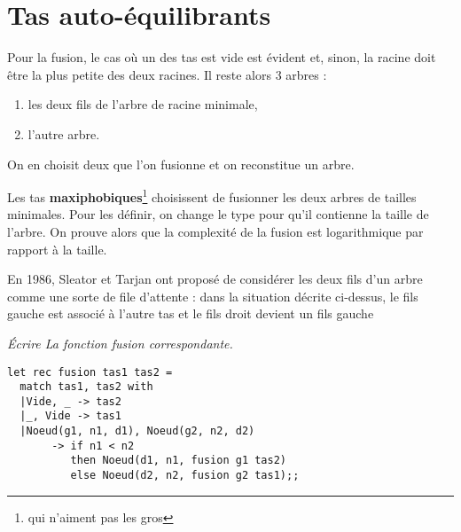 \section{Tas auto-équilibrants}

Pour la fusion, le cas où un des tas est vide est évident et, sinon, la racine doit être la plus petite des deux racines. Il reste alors 3 arbres :
\begin{enumerate}
    \item les deux fils de l'arbre de racine minimale,
    \item l'autre arbre.
\end{enumerate}
On en choisit deux que l'on fusionne et on reconstitue un arbre.

\medskip

Les tas {\bf maxiphobiques}\footnote{ qui n'aiment pas les gros} choisissent de fusionner les deux arbres de tailles minimales. Pour les définir, on change le type pour qu'il contienne la taille de l'arbre. On prouve alors que la complexité de la fusion est logarithmique par rapport à la taille.

\medskip

En 1986, Sleator et Tarjan ont proposé de considérer les deux fils d'un arbre comme une sorte de file d'attente : dans la situation décrite ci-dessus, le fils gauche est associé à l'autre tas et le fils droit devient un fils gauche
\begin{Exercise}[title = Fusion]\it 
Écrire La fonction fusion correspondante.
\end{Exercise}
\begin{Answer}
\begin{lstlisting}
let rec fusion tas1 tas2 =
  match tas1, tas2 with
  |Vide, _ -> tas2
  |_, Vide -> tas1
  |Noeud(g1, n1, d1), Noeud(g2, n2, d2) 
       -> if n1 < n2
          then Noeud(d1, n1, fusion g1 tas2)
          else Noeud(d2, n2, fusion g2 tas1);;
\end{lstlisting}
\end{Answer}

